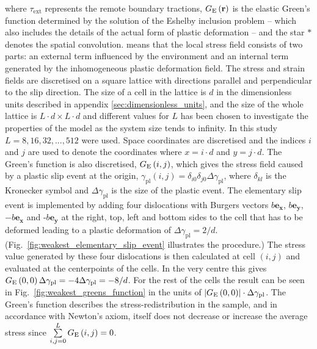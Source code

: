 where ${\tau _{{\text{ext}}}}$ represents the remote boundary tractions, ${G_{\rm{E}}}\left( {\mathbf{r}} \right)$ is the elastic Green's function determined by the solution of the Eshelby inclusion problem \cite{Eshelby376} -- which also includes the details of the actual form of plastic deformation -- and the star $*$ denotes the spatial convolution.  means that the local stress field consists of two parts: an external term influenced by the environment and an internal term generated by the inhomogeneous plastic deformation field. The stress and strain fields are discretised on a square lattice with directions parallel and perpendicular to the slip direction. The size of a cell in the lattice is $d$ in the dimensionless units described in appendix \ref{sec:dimensionless_units}, and the size of the whole lattice is $L \cdot d \times L \cdot d$ and different values for $L$ has been chosen to investigate the properties of the model as the system size tends to infinity. In this study $L=8,16,32,...,512$ were used. Space coordinates are discretised and the indices $i$ and $j$ are used to denote the coordinates where $x=i \cdot d$ and $y = j \cdot d$. The Green's function is also discretised, ${G_{\rm{E}}}\left( {i,j} \right)$, which gives the stress field caused by a plastic slip event at the origin, ${\gamma _{{\text{pl}}}}\left( {i,j} \right) = {\delta _{i0}}{\delta _{j0}}\Delta {\gamma _{{\text{pl}}}}$, where ${\delta _{kl}}$ is the Kronecker symbol and $\Delta {\gamma _{{\text{pl}}}}$ is the size of the plastic event. The elementary slip event is implemented by adding four dislocations with Burgers vectors $b{{\mathbf{e}}_{\mathbf{x}}}$, $b{{\mathbf{e}}_{\mathbf{y}}}$, $-b{{\mathbf{e}}_{\mathbf{x}}}$ and -$b{{\mathbf{e}}_{\mathbf{y}}}$ at the right, top, left and bottom sides to the cell that has to be deformed leading to a plastic deformation of $\Delta {\gamma _{{\text{pl}}}} = 2/d$. (Fig.~\ref{fig:weakest_elementary_slip_event} illustrates the procedure.) The stress value generated by these four dislocations is then calculated at cell $\left( {i,j} \right)$ and evaluated at the centerpoints of the cells. In the very centre this gives ${G_{\rm{E}}}\left( {0,0} \right)\Delta {\gamma _{{\text{pl}}}} =  - 4\Delta {\gamma _{{\text{pl}}}} =  - 8/d$. For the rest of the cells the result can be seen in Fig.~\ref{fig:weakest_greens_function} in the units of  $\left| {{G_{\rm{E}}}\left( {0,0} \right)} \right| \cdot \Delta {\gamma _{{\text{pl}}}}$. The Green's function describes the stress-redistribution in the sample, and in accordance with Newton's axiom, itself does not decrease or increase the average stress since $\sum\limits_{i,j = 0}^L {{G_{\rm{E}}}\left( {i,j} \right)}  = 0$.



